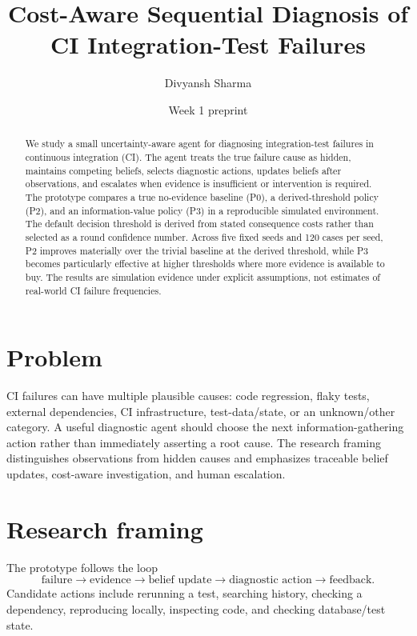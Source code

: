 \documentclass[11pt]{article}
\title{Cost-Aware Sequential Diagnosis of CI Integration-Test Failures}
\author{Divyansh Sharma}
\date{Week 1 preprint}
\begin{document}
\maketitle

\begin{abstract}
We study a small uncertainty-aware agent for diagnosing integration-test failures in continuous integration (CI). The agent treats the true failure cause as hidden, maintains competing beliefs, selects diagnostic actions, updates beliefs after observations, and escalates when evidence is insufficient or intervention is required. The prototype compares a true no-evidence baseline (P0), a derived-threshold policy (P2), and an information-value policy (P3) in a reproducible simulated environment. The default decision threshold is derived from stated consequence costs rather than selected as a round confidence number. Across five fixed seeds and 120 cases per seed, P2 improves materially over the trivial baseline at the derived threshold, while P3 becomes particularly effective at higher thresholds where more evidence is available to buy. The results are simulation evidence under explicit assumptions, not estimates of real-world CI failure frequencies.
\end{abstract}

\section{Problem}
CI failures can have multiple plausible causes: code regression, flaky tests, external dependencies, CI infrastructure, test-data/state, or an unknown/other category. A useful diagnostic agent should choose the next information-gathering action rather than immediately asserting a root cause. The research framing distinguishes observations from hidden causes and emphasizes traceable belief updates, cost-aware investigation, and human escalation.

\section{Research framing}
The prototype follows the loop
\[
\text{failure} \rightarrow \text{evidence} \rightarrow \text{belief update} \rightarrow \text{diagnostic action} \rightarrow \text{feedback}.
\]
Candidate actions include rerunning a test, searching history, checking a dependency, reproducing locally, inspecting code, and checking database/test state.
\end{document}
